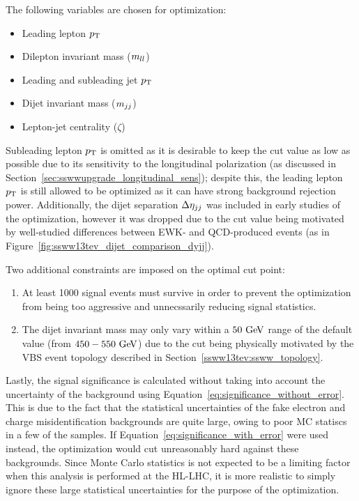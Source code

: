 The following variables are chosen for optimization:
\begin{itemize}
\item Leading lepton $p_{\mathrm{T}}$
\item Dilepton invariant mass ($m_{ll}$)
\item Leading and subleading jet $p_{\mathrm{T}}$
\item Dijet invariant mass ($m_{jj}$)
\item Lepton-jet centrality ($\zeta$)
\end{itemize}
Subleading lepton $p_{\mathrm{T}}$ is omitted as it is desirable to keep the cut value as low as possible due to its sensitivity to the longitudinal polarization (as discussed in Section~\ref{sec:sswwupgrade_longitudinal_sens}); despite this, the leading lepton $p_{\mathrm{T}}$ is still allowed to be optimized as it can have strong background rejection power.
Additionally, the dijet separation $\detajj$ was included in early studies of the optimization, however it was dropped due to the cut value being motivated by well-studied differences between EWK- and QCD-produced \ssww events (as in Figure~\ref{fig:ssww13tev_dijet_comparison_dyjj}).

Two additional constraints are imposed on the optimal cut point:
\begin{enumerate}
\item At least 1000 signal events must survive in order to prevent the optimization from being too aggressive and unnecssarily reducing signal statistics.
\item The dijet invariant mass may only vary within a $50\gev$ range of the default value (from $450-550\gev$) due to the cut being physically motivated by the VBS event topology described in Section~\ref{ssww13tev:ssww_topology}.
\end{enumerate}

Lastly, the signal significance is calculated without taking into account the uncertainty of the background using Equation~\ref{eq:significance_without_error}.
This is due to the fact that the statistical uncertainties of the fake electron and charge misidentification backgrounds are quite large, owing to poor MC statiscs in a few of the samples.
If Equation~\ref{eq:significance_with_error} were used instead, the optimization would cut unreasonably hard against these backgrounds.
Since Monte Carlo statistics is not expected to be a limiting factor when this analysis is performed at the HL-LHC, it is more realistic to simply ignore these large statistical uncertainties for the purpose of the optimization.

